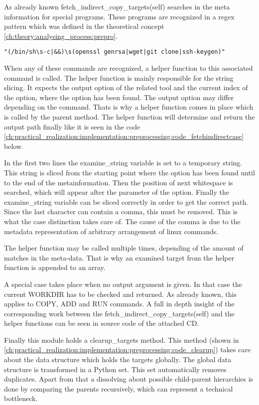As already known fetch\_indirect\_copy\_targets(self) searches in the meta information for special programs. These programs are recognized in a regex pattern which was defined in the theoretical concept \ref{ch:theory:analysing_process:prepro}.
\begin{lstlisting}
"(/bin/sh\s-c|&&)\s(openssl genrsa|wget|git clone|ssh-keygen)"
\end{lstlisting}
When any of these commands are recognized, a helper function to this associated command is called. The helper function is mainly responsible for the string slicing.
It expects the output option of the related tool and the current index of the option, where the option has been found. The output option may differ depending on the command. Thats is why a helper function comes in place which is called by the parent method. The helper function will determine and return the output path finally like it is seen in the code \ref{ch:practical_realization:implementation:preprocessing:code_fetchindirectcase} below.

In the first two lines the examine\_string variable is set to a temporary string. This string is sliced from the starting point where the option has been found until to the end of the metainformation.
Then the position of next whitespace is searched, which will appear after the parameter of the option. Finally the examine\_string variable can be sliced correctly in order to get the correct path. Since the last character can contain a comma, this must be removed. This is what the case distinction takes care of.
The cause of the comma is due to the metadata representation of arbitrary arrangement of linux commands.

The helper function may be called multiple times, depending of the amount of matches in the meta-data. That is why an examined target from the helper function is appended to an array. 

A special case takes place when no output argument is given. In that case the current WORKDIR has to be checked and returned. As already known, this applies to COPY, ADD and RUN commands.
A full in depth insight of the corresponding work between the fetch\_indirect\_copy\_targets(self) and the helper functions can be seen in source code of the attached CD.

Finally this module holds a clearup\_targets method. This method (shown in \ref{ch:practical_realization:implementation:preprocessing:code_clearup}) takes care about the data structure which holds the targets globally. The global data structure is transformed in a Python set. This set automatically removes duplicates. Apart from that a dissolving about possible child-parent hierarchies is done by comparing the parents recursively, which can represent a technical bottleneck. 

